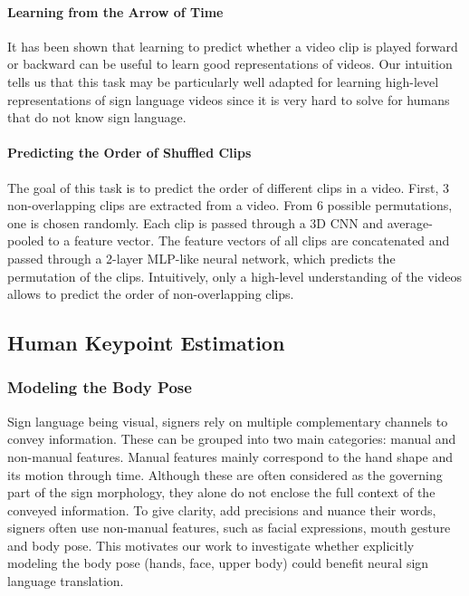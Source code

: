 \documentclass[final]{cvpr}
\begin{document}
\paragraph{Learning from the Arrow of Time}
It has been shown \cite{arrow} that learning to predict whether a video clip is played forward or backward can be useful to learn good representations of videos. Our intuition tells us that this task may be particularly well adapted for learning high-level representations of sign language videos since it is very hard to solve for humans that do not know sign language.
\paragraph{Predicting the Order of Shuffled Clips}
The goal of this task is to predict the order of different clips in a video. First, 3 non-overlapping clips are extracted from a video. From 6 possible permutations, one is chosen randomly. Each clip is passed through a 3D CNN and average-pooled to a feature vector. The feature vectors of all clips are concatenated and passed through a 2-layer MLP-like neural network, which predicts the permutation of the clips. Intuitively, only a high-level understanding of the videos allows to predict the order of non-overlapping clips.
\subsection{Human Keypoint Estimation}
\subsubsection{Modeling the Body Pose}
Sign language being visual, signers rely on multiple complementary channels to convey information. These can be grouped into two main categories: manual and non-manual features. Manual features mainly correspond to the hand shape and its motion through time. Although these are often considered as the governing part of the sign morphology, they alone do not enclose the full context of the conveyed information. To give clarity, add precisions and nuance their words, signers often use non-manual features, such as facial expressions, mouth gesture and body pose. This motivates our work to investigate whether explicitly modeling the body pose (hands, face, upper body) could benefit neural sign language translation.
\end{document}
